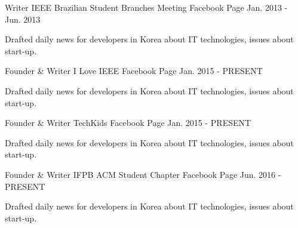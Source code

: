 

\begin{cventries}

  \cventry
    {Writer} %
    {IEEE Brazilian Student Branches Meeting} %
    {Facebook Page} %
    {Jan. 2013 - Jun. 2013} %
    {
      \begin{cvitems} %
        \item {Drafted daily news for developers in Korea about IT technologies, issues about start-up.}
      \end{cvitems}
    }
    
  \cventry
    {Founder \& Writer} %
    {I Love IEEE} %
    {Facebook Page} %
    {Jan. 2015 - PRESENT} %
    {
      \begin{cvitems} %
        \item {Drafted daily news for developers in Korea about IT technologies, issues about start-up.}
      \end{cvitems}
    }
    
  \cventry
    {Founder \& Writer} %
    {TechKids} %
    {Facebook Page} %
    {Jan. 2015 - PRESENT} %
    {
      \begin{cvitems} %
        \item {Drafted daily news for developers in Korea about IT technologies, issues about start-up.}
      \end{cvitems}
    }
    
  \cventry
    {Founder \& Writer} %
    {IFPB ACM Student Chapter} %
    {Facebook Page} %
    {Jun. 2016 - PRESENT} %
    {
      \begin{cvitems} %
        \item {Drafted daily news for developers in Korea about IT technologies, issues about start-up.}
      \end{cvitems}
    }
    

\end{cventries}
